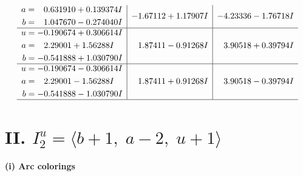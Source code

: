\documentclass[1p]{elsarticle_modified}
\theoremstyle{definition}
\begin{document}
$$\begin{array}{c|c|c}
\begin{aligned}
a &= \phantom{-}0.631910 + 0.139374 I \\
b &= \phantom{-}1.047670 - 0.274040 I\end{aligned}
 & -1.67112 + 1.17907 I & -4.23336 - 1.76718 I \\ \hline\begin{aligned}
u &= -0.190674 + 0.306614 I \\
a &= \phantom{-}2.29001 + 1.56288 I \\
b &= -0.541888 + 1.030790 I\end{aligned}
 & \phantom{-}1.87411 - 0.91268 I & \phantom{-}3.90518 + 0.39794 I \\ \hline\begin{aligned}
u &= -0.190674 - 0.306614 I \\
a &= \phantom{-}2.29001 - 1.56288 I \\
b &= -0.541888 - 1.030790 I\end{aligned}
 & \phantom{-}1.87411 + 0.91268 I & \phantom{-}3.90518 - 0.39794 I\\
 \hline 
 \end{array}$$\newpage\newpage\renewcommand{\arraystretch}{1}
\centering \section*{II. $I^u_{2}= \langle b+1,\;a-2,\;u+1 \rangle$}
\flushleft \textbf{(i) Arc colorings}\\
\end{document}
